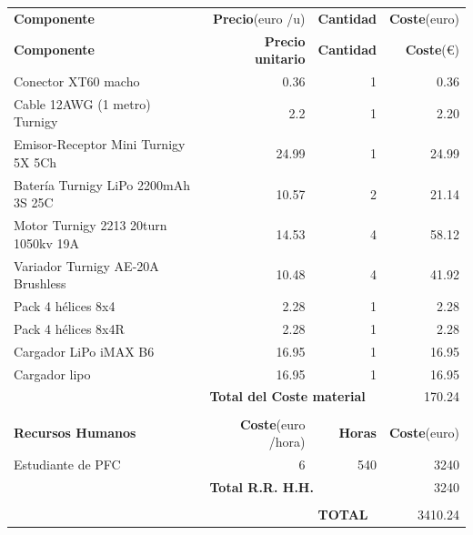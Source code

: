 \documentclass[twoside,11pt]{report}
\begin{document}
\hspace{-1cm}
\begin{tabular}{|l|r|r|r|}
\hline

\hspace{2cm}\textbf{Componente} & \textbf{Precio}(euro /u) & \textbf{Cantidad} & \textbf{Coste}(euro) \\
\textbf{Componente} & \textbf{Precio unitario} & \textbf{Cantidad} & \textbf{Coste}(€) \\

\hline
\hline
Conector XT60 macho & 0.36 & 1 & 0.36 \\
Cable 12AWG (1 metro) Turnigy & 2.2 & 1 & 2.20 \\
Emisor-Receptor Mini Turnigy 5X 5Ch & 24.99 & 1 & 24.99 \\
Batería Turnigy LiPo 2200mAh 3S 25C & 10.57 & 2 & 21.14 \\
Motor Turnigy 2213 20turn 1050kv 19A & 14.53 & 4 & 58.12 \\
Variador Turnigy AE-20A Brushless & 10.48 & 4 & 41.92 \\
Pack 4 hélices 8x4 & 2.28 & 1 & 2.28 \\
Pack 4 hélices 8x4R & 2.28 & 1 & 2.28 \\ 

Cargador LiPo iMAX B6 & 16.95 & 1 & 16.95 \\
\hline \cmidrule{2-4}

Cargador lipo & 16.95 & 1 & 16.95 \\
\hline \cmidrule{3-4}

\multicolumn{1}{r}{} & \multicolumn{2}{|l|}{\textbf{Total del Coste material}} & 170.24 \\ \cmidrule{2-4}
\multicolumn{4}{r}{} \\
\hline
\hspace{1.5cm}\textbf{Recursos Humanos} & \textbf{Coste}(euro /hora) & \textbf{Horas} & \textbf{Coste}(euro) \\
\hline
\hline
Estudiante de PFC & 6 & 540 & 3240 \\
\hline \cmidrule{2-4}
\multicolumn{1}{r}{} & \multicolumn{2}{|l|}{\textbf{Total R.R. H.H.}} & 3240 \\ \cmidrule{2-4}
\multicolumn{4}{r}{} \\
\cmidrule{3-4}
\multicolumn{2}{r}{} & \multicolumn{1}{|l|}{\textbf{TOTAL}} & 3410.24 \\ \cmidrule{3-4}
\end{tabular} 
\end{document}

